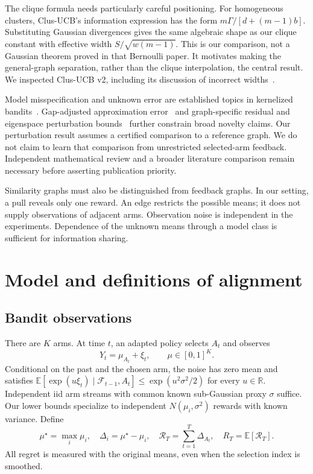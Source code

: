 \documentclass[11pt]{article}
\newcommand{\R}{\mathbb R}
\newcommand{\E}{\mathbb E}
\begin{document}
The clique formula needs particularly careful positioning. For homogeneous clusters, Clus-UCB's information expression has the form $m\Gamma/[d+(m-1)b]$. Substituting Gaussian divergences gives the same algebraic shape as our clique constant with effective width $S/\sqrt{w(m-1)}$. This is our comparison, not a Gaussian theorem proved in that Bernoulli paper. It motivates making the general-graph separation, rather than the clique interpolation, the central result. We inspected Clus-UCB v2, including its discussion of incorrect widths~\cite{gore2025}.

Model misspecification and unknown error are established topics in kernelized bandits~\cite{bogunovic2021}. Gap-adjusted approximation error~\cite{liu2023} and graph-specific residual and eigenspace perturbation bounds~\cite{mondal2026} further constrain broad novelty claims. Our perturbation result assumes a certified comparison to a reference graph. We do not claim to learn that comparison from unrestricted selected-arm feedback. Independent mathematical review and a broader literature comparison remain necessary before asserting publication priority.

Similarity graphs must also be distinguished from feedback graphs. In our setting, a pull reveals only one reward. An edge restricts the possible means; it does not supply observations of adjacent arms. Observation noise is independent in the experiments. Dependence of the unknown means through a model class is sufficient for information sharing.

\section{Model and definitions of alignment}
\subsection{Bandit observations}
There are $K$ arms. At time $t$, an adapted policy selects $A_t$ and observes
\begin{equation}
 Y_t=\mu_{A_t}+\xi_t,\qquad \mu\in[0,1]^K.
 \label{eq:model}
\end{equation}
Conditional on the past and the chosen arm, the noise has zero mean and satisfies
$\E[\exp(u\xi_t)\mid\mathcal F_{t-1},A_t]\le\exp(u^2\sigma^2/2)$ for every $u\in\R$.
Independent iid arm streams with common known sub-Gaussian proxy $\sigma$ suffice. Our lower bounds specialize to independent $N(\mu_i,\sigma^2)$ rewards with known variance. Define
\begin{equation}
 \mu^\star=\max_i\mu_i,\quad \Delta_i=\mu^\star-\mu_i,
 \quad \mathcal R_T=\sum_{t=1}^T\Delta_{A_t},\quad
 R_T=\E[\mathcal R_T].
\end{equation}
All regret is measured with the original means, even when the selection index is smoothed.
\end{document}

